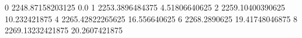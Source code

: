 0 2248.87158203125 0.0
1 2253.3896484375 4.51806640625
2 2259.10400390625 10.232421875
4 2265.42822265625 16.556640625
6 2268.2890625 19.41748046875
8 2269.13232421875 20.2607421875
